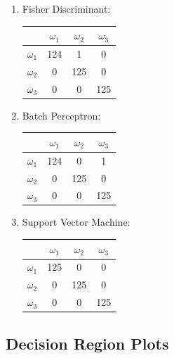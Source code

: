 \documentclass[a4paper]{article}
\begin{document}
\begin{multicols}{2}
\begin{enumerate}
\item Fisher Discriminant:

\begin{tabular}{ | l | c | c | c | }
\hline
& $\omega_1$ & $\omega_2$ & $\omega_3$ \\
\hline
  $\omega_1$ & 124 & 1 & 0 \\
\hline
  $\omega_2$ & 0 & 125 & 0 \\
\hline
  $\omega_3$ & 0 & 0 & 125 \\
\hline
\end{tabular}

\item Batch Perceptron:

\begin{tabular}{ | l | c | c | c | }
\hline
& $\omega_1$ & $\omega_2$ & $\omega_3$ \\
\hline
  $\omega_1$ & 124 & 0 & 1 \\
\hline
  $\omega_2$ & 0 & 125 & 0 \\
\hline
  $\omega_3$ & 0 & 0 & 125 \\
\hline
\end{tabular}
\columnbreak

\item Support Vector Machine:

\begin{tabular}{ | l | c | c | c | }
\hline
& $\omega_1$ & $\omega_2$ & $\omega_3$ \\
\hline
  $\omega_1$ & 125 & 0 & 0 \\
\hline
  $\omega_2$ & 0 & 125 & 0 \\
\hline
  $\omega_3$ & 0 & 0 & 125 \\
\hline
\end{tabular}


\end{enumerate}
\end{multicols}


\newpage
\subsection{Decision Region Plots}
\end{document}
